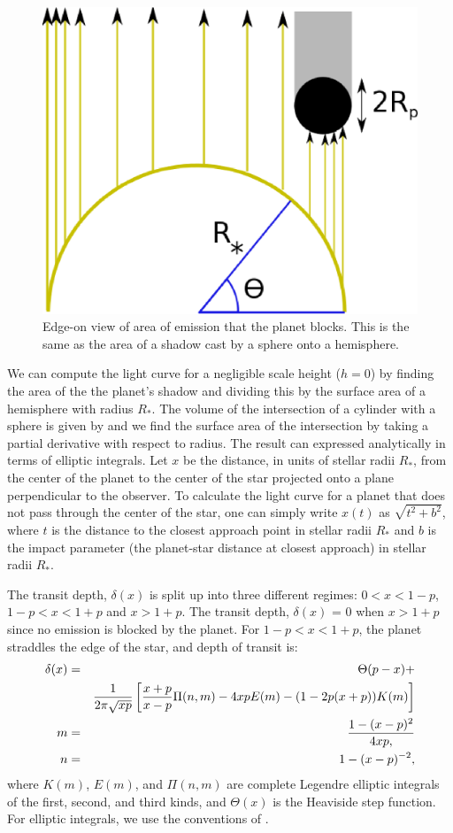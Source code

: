 \documentclass[manuscript]{aastex}
\begin{document}
\begin{figure}
\includegraphics[width=0.5 \textwidth]{chrom_shadow2.eps}
\caption{Edge-on view of area of emission that the planet blocks. This is the same as the area of a shadow cast by a sphere onto a hemisphere.}
\label{fig01}
\end{figure}

We can compute the light curve for a negligible scale height ($h=0$) by finding the area of the the planet's shadow and dividing this by the surface area of a hemisphere with radius $R_*$. The volume of the intersection of a cylinder with a sphere is given by \citet{lamarche} and we find the surface area of the intersection by taking a partial derivative with respect to radius. The result can expressed analytically in terms of elliptic integrals.
Let $x$ be the distance, in units of stellar radii $R_*$, from the center of the planet to the center of the star projected onto a plane perpendicular to the observer. To calculate the light curve for a planet that does not pass through the center of the star, one can simply write $x(t)$ as $\sqrt{t^2+b^2}$, where $t$ is the distance to the closest approach point in stellar radii $R_*$ and $b$ is the impact parameter (the planet-star distance at closest approach) in stellar radii $R_*$. 

The transit depth, $\delta (x)$ is split up into three different regimes: $0 < x < 1 -p$, $1 - p < x < 1+p$ and $ x > 1+p$. The transit depth, $\delta (x)$ = 0 when $x > 1 + p$ since no emission is blocked by the planet.
For $1-p < x < 1+p$, the planet straddles the edge of the star, and
depth of transit is:
\begin{eqnarray}\label{ingress}
\delta(x)&=&\Theta(p-x) +\\
&& {1\over 2 \pi \sqrt{xp}} \left[{x+p\over x-p}\Pi(n,m)-4xpE(m) -(1-2p(x+p))K(m)\right] \cr
m&=&1-(x-p)^2\over 4xp, \cr 
n&=&1-(x-p)^{-2},
\end{eqnarray}
where $K(m)$, $E(m)$, and $\Pi(n,m)$ are complete Legendre elliptic 
integrals of the first, second, and third kinds, and $\Theta(x)$ is
the Heaviside step function. For elliptic integrals, we use the conventions of \citet{handbk}.
\end{document}
